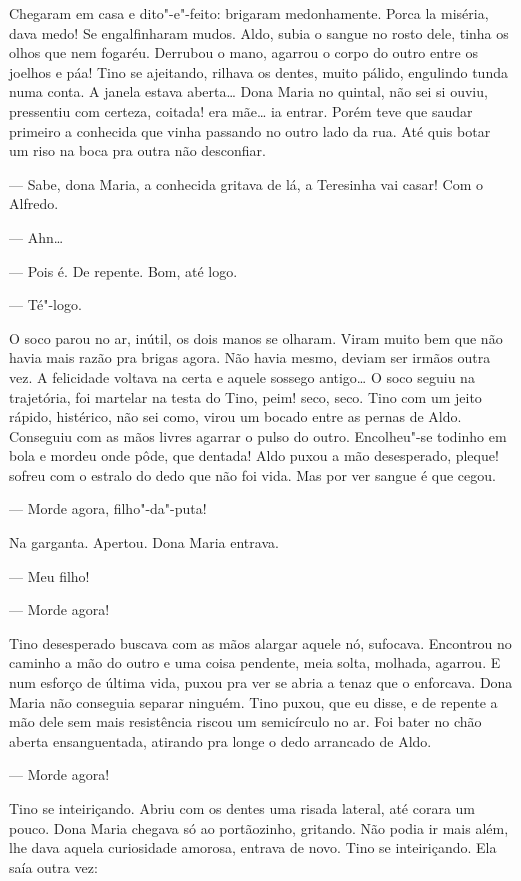 \begin{linenumbers}
Chegaram em casa e dito"-e"-feito: brigaram medonhamente. Porca la
miséria, dava medo! Se engalfinharam mudos. Aldo, subia o sangue no
rosto dele, tinha os olhos que nem fogaréu. Derrubou o mano, agarrou o
corpo do outro entre os joelhos e páa! Tino se ajeitando, rilhava os
dentes, muito pálido, engulindo tunda numa conta. A janela estava
aberta\ldots{} Dona Maria no quintal, não sei si ouviu, pressentiu com
certeza, coitada! era mãe\ldots{} ia entrar. Porém teve que saudar primeiro a
conhecida que vinha passando no outro lado da rua. Até quis botar um
riso na boca pra outra não desconfiar.

--- Sabe, dona Maria, a conhecida gritava de lá, a Teresinha vai casar!
Com o Alfredo.

--- Ahn\ldots{}

--- Pois é. De repente. Bom, até logo.

--- Té"-logo.

O soco parou no ar, inútil, os dois manos se olharam. Viram muito bem
que não havia mais razão pra brigas agora. Não havia mesmo, deviam ser
irmãos outra vez. A felicidade voltava na certa e aquele sossego
antigo\ldots{} O soco seguiu na trajetória, foi martelar na testa do Tino,
peim! seco, seco. Tino com um jeito rápido, histérico, não sei como,
virou um bocado entre as pernas de Aldo. Conseguiu com as mãos livres
agarrar o pulso do outro. Encolheu"-se todinho em bola e mordeu onde
pôde, que dentada! Aldo puxou a mão desesperado, pleque! sofreu com o
estralo do dedo que não foi vida. Mas por ver sangue é que cegou.

--- Morde agora, filho"-da"-puta!

Na garganta. Apertou. Dona Maria entrava. 

--- Meu filho!

--- Morde agora!

Tino desesperado buscava com as mãos alargar aquele nó, sufocava.
Encontrou no caminho a mão do outro e uma coisa pendente, meia solta,
molhada, agarrou. E num esforço de última vida, puxou pra ver se abria a
tenaz que o enforcava. Dona Maria não conseguia separar ninguém. Tino
puxou, que eu disse, e de repente a mão dele sem mais resistência riscou
um semicírculo no ar. Foi bater no chão aberta ensanguentada, atirando
pra longe o dedo arrancado de Aldo.

--- Morde agora!

Tino se inteiriçando. Abriu com os dentes uma risada lateral, até corara
um pouco. Dona Maria chegava só ao portãozinho, gritando. Não podia ir
mais além, lhe dava aquela curiosidade amorosa, entrava de novo. Tino se
inteiriçando. Ela saía outra vez:


\end{linenumbers}
